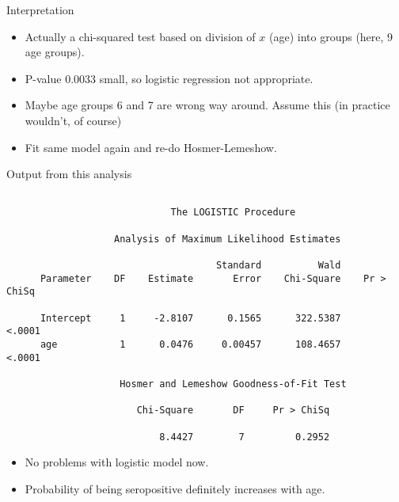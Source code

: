 \documentclass[pdf]{prosper}
\begin{document}
\begin{slide}{Interpretation}

\begin{itemize}
\item Actually a chi-squared test based on division of $x$ (age) into groups (here, 9 age groups).
\item P-value 0.0033 small, so logistic regression not appropriate.
\item Maybe age groups 6 and 7 are wrong way around. Assume this (in practice wouldn't, of course)
\item Fit same model again and re-do Hosmer-Lemeshow.
\end{itemize}

  
\end{slide}

\begin{slide}{Output from this analysis}

{\scriptsize
\begin{verbatim}

                             The LOGISTIC Procedure

                   Analysis of Maximum Likelihood Estimates

                                     Standard          Wald
      Parameter    DF    Estimate       Error    Chi-Square    Pr > ChiSq

      Intercept     1     -2.8107      0.1565      322.5387        <.0001
      age           1      0.0476     0.00457      108.4657        <.0001

                    Hosmer and Lemeshow Goodness-of-Fit Test

                       Chi-Square       DF     Pr > ChiSq

                           8.4427        7         0.2952
\end{verbatim}
}

\begin{itemize}
\item No problems with logistic model now.
\item Probability of being seropositive definitely increases with age.
\end{itemize}
  
\end{slide}
\end{document}
